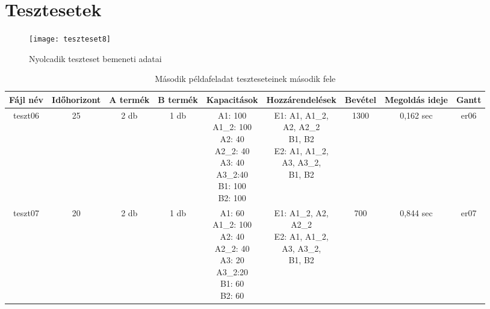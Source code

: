 \appendix
\chapter{Tesztesetek}

\begin{figure}[H]
\begin{center}
\texttt{[image: teszteset8]}
\caption{Nyolcadik teszteset bemeneti adatai}
\label{teszteset8}
\end{center}
\end{figure}

\begin{table}
	\begin{center}
	\caption{Második példafeladat teszteseteinek második fele}
  	\captionsetup[table]{skip=10pt}
  	\label{tab:table3}  	
  	\begin{sideways}  	  	
  		\begin{tabular}{|c|c|c|c|c|c|c|c|c|}
  		\hline
		Fájl név & Időhorizont & A termék & B termék & Kapacitások & Hozzárendelések & Bevétel & Megoldás ideje & Gantt \\
		\hline
		teszt06 & 25 & 2 db & 1 db & \makecell{A1: 100 \\ A1\_2: 100\\A2: 40\\A2\_2: 40\\A3: 40\\A3\_2:40\\B1: 100\\B2: 100} & \makecell{E1: A1, A1\_2,\\A2, A2\_2 \\B1, B2 \\E2: A1, A1\_2,\\ A3, A3\_2, \\ B1, B2} & 1300 & 0,162 sec & er06 \\
		\hline	
		teszt07 & 20 & 2 db & 1 db & \makecell{A1: 60\\A1\_2: 100\\A2: 40\\A2\_2: 40\\A3: 20\\A3\_2:20\\B1: 60\\B2: 60} & \makecell{E1: A1\_2, A2,\\A2\_2 \\ E2: A1, A1\_2,\\ A3, A3\_2, \\ B1, B2} & 700 & 0,844 sec & er07 \\

\end{tabular}
\end{sideways}
\end{center}
\end{table}
